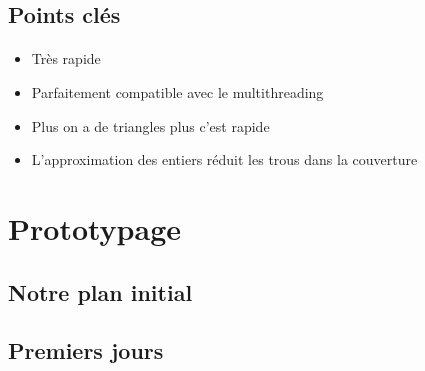 \subsection{Points clés}

\begin{frame}[fragile=singleslide]{\insertsectionhead}
  \framesubtitle{\insertsubsectionhead}
  \begin{itemize}
      \item Très rapide
      \item Parfaitement compatible avec le multithreading
      \item Plus on a de triangles plus c'est rapide
      \item L'approximation des entiers réduit les trous dans la couverture
    \end{itemize}
    \vfill
    \begin{figure}
      \begin{subfigure}{1\textwidth}
      \end{subfigure}
    \end{figure}
    
    
\end{frame}

\section{Prototypage}

\subsection{Notre plan initial}

\begin{frame}[fragile=singleslide]{\insertsectionhead}
  \framesubtitle{\insertsubsectionhead}
\end{frame}

\subsection{Premiers jours}

